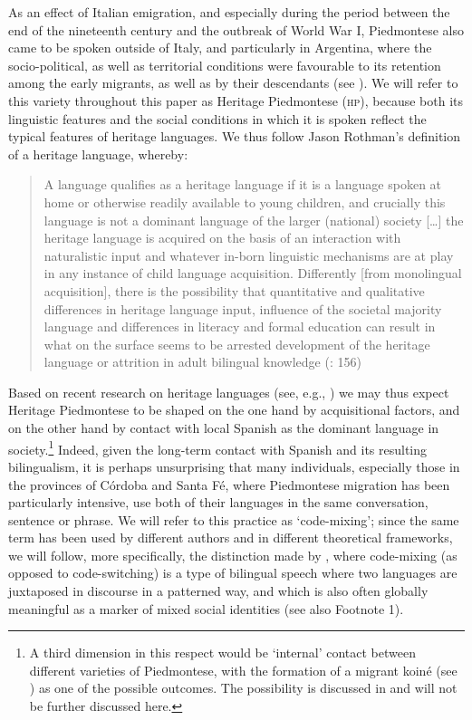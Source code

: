 \documentclass[output=paper]{langscibook}
\begin{document}
As an effect of Italian emigration, and especially during the period between the end of the nineteenth century and the outbreak of World War I, Piedmontese also came to be spoken outside of Italy, and particularly in Argentina, where the socio-political, as well as territorial conditions were favourable to its retention among the early migrants, as well as by their descendants (see \citealt{Giolitto2000,Giolitto2010,giolitto_palabras_2016,Goria2015,Goria2021,Doglioli2022}). We will refer to this variety throughout this paper as Heritage Piedmontese (\textsc{hp}), because both its linguistic features and the social conditions in which it is spoken reflect the typical features of heritage languages. We thus follow Jason Rothman’s definition of a heritage language, whereby:

\begin{quote}
A language qualifies as a heritage language if it is a language spoken at home or otherwise readily available to young children, and crucially this language is not a dominant language of the larger (national) society […] the heritage language is acquired on the basis of an interaction with naturalistic input and whatever in-born linguistic mechanisms are at play in any instance of child language acquisition. Differently [from monolingual acquisition], there is the possibility that quantitative and qualitative differences in heritage language input, influence of the societal majority language and differences in literacy and formal education can result in what on the surface seems to be arrested development of the heritage language or attrition in adult bilingual knowledge (\citealt{Rothman2009}: 156)
\end{quote}

Based on recent research on heritage languages (see, e.g., \citealt{BenmamounEtAl2013,Nagy2017,Polinsky2018,AalberseEtAl2019,GoriaDiSalvo2023}) we may thus expect Heritage Piedmontese to be shaped on the one hand by acquisitional factors, and on the other hand by contact with local Spanish as the dominant language in society.\footnote{A third dimension in this respect would be ‘internal’ contact between different varieties of Piedmontese, with the formation of a migrant koiné (see \citealt{Kerswill2006}) as one of the possible outcomes. The possibility is discussed in \citet{CerrutiEtAlinpress} and will not be further discussed here.}  Indeed, given the long-term contact with Spanish and its resulting bilingualism, it is perhaps unsurprising that many individuals, especially those in the provinces of Córdoba and Santa Fé, where Piedmontese migration has been particularly intensive, use both of their languages in the same conversation, sentence or phrase. We will refer to this practice as ‘code-mixing’; since the same term has been used by different authors and in different theoretical frameworks, we will follow, more specifically, the distinction made by \citet{Auer1999,Auer2014}, where code-mixing (as opposed to code-switching) is a type of bilingual speech where two languages are juxtaposed in discourse in a patterned way, and which is also often globally meaningful as a marker of mixed social identities (see also Footnote 1).
\end{document}
